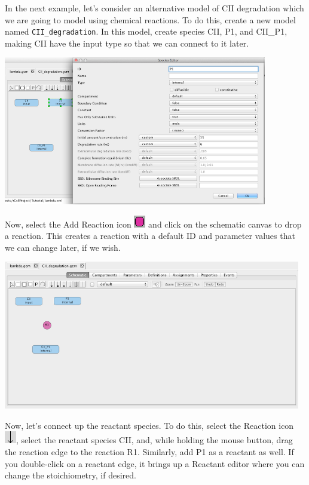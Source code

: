 \documentclass[titlepage,11pt]{article}
\begin{document}
In the next example, let's consider an alternative model of CII degradation which we are going to model using chemical reactions.  To do this, create a new model named {\tt CII\_degradation}.  In this model, create species CII, P1, and CII\_P1, making CII have the input type so that we can connect to it later.  

\begin{center}
\includegraphics[height=65mm]{screenshots/P1}
\end{center}

Now, select the Add Reaction icon \includegraphics{../gui/icons/modelview/add_reaction_selected} and click on the schematic canvas to drop a reaction.  This creates a reaction with a default ID and parameter values that we can change later, if we wish.

\begin{center}
\includegraphics[height=65mm]{screenshots/reaction}
\end{center}

Now, let's connect up the reactant species.  To do this, select the Reaction icon \includegraphics{../gui/icons/modelview/reaction_selected}, select the reactant species CII, and, while holding the mouse button, drag the reaction edge to the reaction R1.  Similarly, add P1 as a reactant as well.  If you double-click on a reactant edge, it brings up a Reactant editor where you can change the stoichiometry, if desired.
\end{document}
